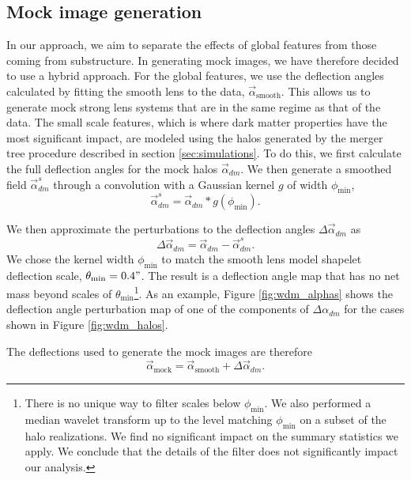 \documentclass[a4paper,11pt]{article}
\begin{document}
\subsection{Mock image generation}
In our approach, we aim to separate the effects of global features from those coming from substructure. In generating mock images, we have therefore decided to use a hybrid approach. For the global features, we use the deflection angles calculated by fitting the smooth lens to the data, $\vec{\alpha}_{\text{smooth}}$. This allows us to generate mock strong lens systems that are in the same regime as that of the data. The small scale features, which is where dark matter properties have the most significant impact, are modeled using the halos generated by the merger tree procedure described in section \ref{sec:simulations}. To do this, we first calculate the full deflection angles for the mock halos $\vec{\alpha}_{dm}$. We then generate a smoothed field $\vec{\alpha}^{s}_{dm}$ through a convolution with a Gaussian kernel $g$ of width $\phi_{\text{min}}$,
\begin{equation}
	\vec{\alpha}^{s}_{dm} = \vec{\alpha}_{dm} \ast g(\phi_{\text{min}}).
\end{equation}

We then approximate the perturbations to the deflection angles $\Delta \vec{\alpha}_{dm}$ as
\begin{equation}
	\Delta \vec{\alpha}_{dm} = \vec{\alpha}_{dm} - \vec{\alpha}^{s}_{dm}.
\end{equation}
We chose the kernel width $\phi_{\text{min}}$ to match the smooth lens model shapelet deflection scale, $\theta_{\text{min}}= 0.4"$. The result is a deflection angle map that has no net mass beyond scales of $\theta_{\text{min}}$\footnote{There is no unique way to filter scales below $\phi_{\text{min}}$. We also performed a median wavelet transform up to the level matching $\phi_{\text{min}}$ on a subset of the halo realizations. We find no significant impact on the summary statistics we apply. We conclude that the details of the filter does not significantly impact our analysis.}. As an example, Figure \ref{fig:wdm_alphas}  shows the deflection angle perturbation map of one of the components of $\Delta \alpha_{dm}$ for the cases shown in Figure \ref{fig:wdm_halos}.


The deflections used to generate the mock images are therefore
\begin{equation}
	\vec{\alpha}_{\text{mock}} = \vec{\alpha}_{\text{smooth}} + \Delta \vec{\alpha}_{dm} .
\end{equation}
\end{document}
